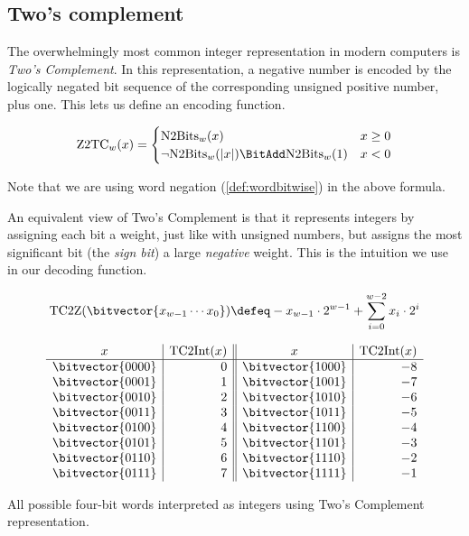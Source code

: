 \subsection{Two's complement}
\label{sec:twos-complement}

The overwhelmingly most common integer representation in modern
computers is \emph{Two's Complement}.  In this representation, a
negative number is encoded by the logically negated bit sequence of
the corresponding unsigned positive number, plus one.  This lets us
define an encoding function.

\begin{definition}
\begin{align*}
  \mathrm{Z2TC}_{w}(x) =
  \begin{cases}
    \mathrm{N2Bits}_{w}(x) & x \geq 0 \\
    \neg \mathrm{N2Bits}_{w}(|x|) \BitAdd \mathrm{N2Bits}_{w}(1) & x < 0
  \end{cases}
\end{align*}
\label{def:z2tc}
\end{definition}

Note that we are using word negation (\cref{def:wordbitwise}) in the
above formula.

An equivalent view of Two's Complement is that it represents integers
by assigning each bit a weight, just like with unsigned numbers, but
assigns the most significant bit (the \emph{sign bit}) a large
\emph{negative} weight.  This is the intuition we use in our decoding
function.

\begin{definition}
\begin{align*}
  \mathrm{TC2Z}(\bitvector{x_{w-1}\cdots x_{0}}) \defeq -x_{w-1}\cdot 2^{w-1} + \sum_{i=0}^{w-2} x_{i} \cdot{} 2^{i}
\end{align*}
\label{def:tc2Z}
\end{definition}

\begin{table}
  \centering
  \[
  \begin{array}{c|r||c|r}
    x & \mathrm{TC2Int}(x) & x & \mathrm{TC2Int}(x) \\\hline
    \bitvector{0000} & 0 & \bitvector{1000} & -8 \\
    \bitvector{0001} & 1 & \bitvector{1001} & -7 \\
    \bitvector{0010} & 2 & \bitvector{1010} & -6 \\
    \bitvector{0011} & 3 & \bitvector{1011} & -5 \\
    \bitvector{0100} & 4 & \bitvector{1100} & -4 \\
    \bitvector{0101} & 5 & \bitvector{1101} & -3 \\
    \bitvector{0110} & 6 & \bitvector{1110} & -2 \\
    \bitvector{0111} & 7 & \bitvector{1111} & -1 \\
  \end{array}
  \]
  \caption{All possible four-bit words interpreted as integers using
    Two's Complement representation.}
  \label{tab:twos-complement}
\end{table}

